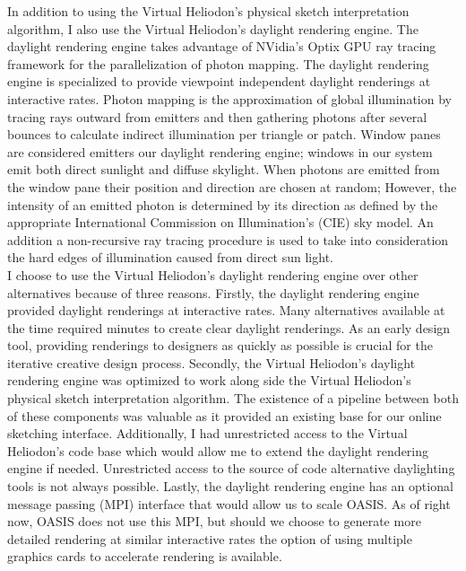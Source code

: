 	In addition to using the Virtual Heliodon's physical sketch interpretation algorithm, I also use the Virtual Heliodon's daylight rendering engine\cite{li2011photon,nasman2013physical}. 
	The daylight rendering engine takes advantage of NVidia's Optix GPU ray tracing framework for the parallelization of photon mapping\cite{parker2010optix}.
	The daylight rendering engine is specialized to provide viewpoint independent daylight renderings at interactive rates.
	Photon mapping is the approximation of global illumination by tracing rays outward from emitters and then gathering photons after several bounces to calculate indirect illumination per triangle or patch\cite{hachisuka2008progressive}.
	Window panes are considered emitters our daylight rendering engine; windows in our system emit both direct sunlight and diffuse skylight.
	When photons are emitted from the window pane their position and direction are chosen at random; However, the intensity of an emitted photon is determined by its direction as defined by the appropriate International Commission on Illumination's (CIE) sky model\cite{de1994spatial}.
	An addition a non-recursive ray tracing procedure is used to take into consideration the hard edges of illumination caused from direct sun light. 
	\\

	I choose to use the Virtual Heliodon's daylight rendering engine over other alternatives because of three reasons.
	Firstly, the daylight rendering engine provided daylight renderings at interactive rates. Many alternatives available at the time required minutes to create clear daylight renderings. As an early design tool, providing renderings to designers as quickly as possible is crucial for the iterative creative design process.
	Secondly, the Virtual Heliodon's daylight rendering engine was optimized to work along side the Virtual Heliodon's physical sketch interpretation algorithm. The existence of a pipeline between both of these components was valuable as it provided an existing base for our online sketching interface. Additionally, I had unrestricted access to the Virtual Heliodon's code base which would allow me to extend the daylight rendering engine if needed. Unrestricted access to the source of code alternative daylighting tools is not always possible.
	Lastly, the daylight rendering engine has an optional message passing (MPI) interface that would allow us to scale OASIS. As of right now, OASIS does not use this MPI, but should we choose to generate more detailed rendering at similar interactive rates the option of using multiple graphics cards to accelerate rendering is available.
	\\

